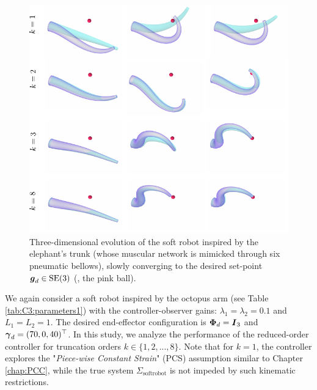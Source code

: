 %
\begin{figure}[!t]
  \centering
  \vspace{-2mm}
  \includegraphics*[width=1.04\textwidth]{./pdf/thesis-figure-5-13.pdf}
  \vspace{-5mm}
  \caption{\small Three-dimensional evolution of the soft robot inspired by the elephant's trunk (whose muscular network is mimicked through six pneumatic bellows), slowly converging to the desired set-point $\boldsymbol{g}_d \in \textup{\textrm{SE}}(3)$ (\ie, the pink ball). }
  \label{fig:C3:softarm_3D_truncation}
  \vspace{-6mm}
\end{figure}
%
We again consider a soft robot inspired by the octopus arm (see Table \ref{tab:C3:parameters1}) with the controller-observer gains: $\lambda_1 = \lambda_2 = 0.1$ and $L_1 = L_2 = 1$. The desired end-effector configuration is ${\boldsymbol{\Phi}}_d = {\boldsymbol{I}}_3$ and ${\boldsymbol{\gamma}}_d = (70, 0, 40)^\top$. In this study, we analyze the performance of the reduced-order controller for truncation orders $k \in \{1,2,...,8\}$. Note that for $k=1$, the controller explores the "\emph{Piece-wise Constant Strain}" (PCS) assumption similar to Chapter \ref{chap:PCC}, while the true system $\Sigma_{\textrm{softrobot}}$ is not impeded by such kinematic restrictions. %

